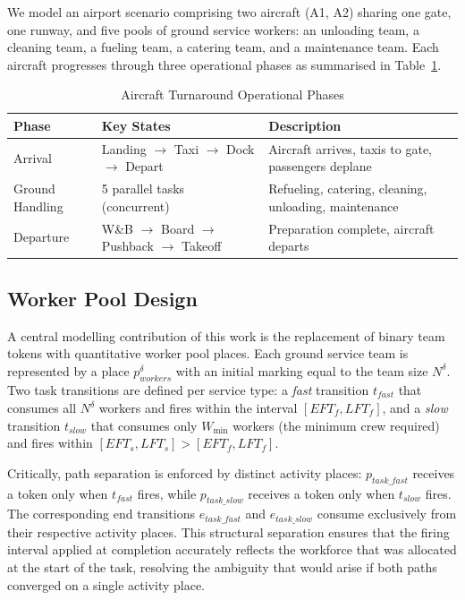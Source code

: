 \documentclass[conference]{IEEEtran}
\begin{document}
We model an airport scenario comprising two aircraft (A1, A2) sharing one gate,
one runway, and five pools of ground service workers: an unloading team, a
cleaning team, a fueling team, a catering team, and a maintenance team. Each
aircraft progresses through three operational phases as summarised in
Table~\ref{tab:phases}.

\begin{table}[t]
  \caption{Aircraft Turnaround Operational Phases}
  \label{tab:phases}
  \small
  \begin{tabular}{@{}p{2.2cm} p{5.5cm} p{8.5cm}@{}}
    \toprule
    \textbf{Phase} & \textbf{Key States} & \textbf{Description} \\
    \midrule
    Arrival
      & Landing $\to$ Taxi $\to$ Dock $\to$ Depart
      & Aircraft arrives, taxis to gate, passengers deplane \\[4pt]
    Ground Handling
      & 5 parallel tasks (concurrent)
      & Refueling, catering, cleaning, unloading, maintenance \\[4pt]
    Departure
      & W\&B $\to$ Board $\to$ Pushback $\to$ Takeoff
      & Preparation complete, aircraft departs \\
    \bottomrule
  \end{tabular}
\end{table}

\subsection{Worker Pool Design}

A central modelling contribution of this work is the replacement of binary team
tokens with quantitative worker pool places. Each ground service team is
represented by a place $p_{\mathit{workers}}^{\delta}$ with an initial marking
equal to the team size $N^{\delta}$. Two task transitions are defined per service
type: a \textit{fast} transition $t_{\mathit{fast}}$ that consumes all
$N^{\delta}$ workers and fires within the interval $[\mathit{EFT}_f,
\mathit{LFT}_f]$, and a \textit{slow} transition $t_{\mathit{slow}}$ that
consumes only $W_{\min}$ workers (the minimum crew required) and fires within
$[\mathit{EFT}_s, \mathit{LFT}_s] > [\mathit{EFT}_f, \mathit{LFT}_f]$.

Critically, path separation is enforced by distinct activity places:
$p_{\mathit{task\_fast}}$ receives a token only when $t_{\mathit{fast}}$ fires,
while $p_{\mathit{task\_slow}}$ receives a token only when $t_{\mathit{slow}}$
fires. The corresponding end transitions $e_{\mathit{task\_fast}}$ and
$e_{\mathit{task\_slow}}$ consume exclusively from their respective activity
places. This structural separation ensures that the firing interval applied at
completion accurately reflects the workforce that was allocated at the start of
the task, resolving the ambiguity that would arise if both paths converged on a
single activity place.
\end{document}
